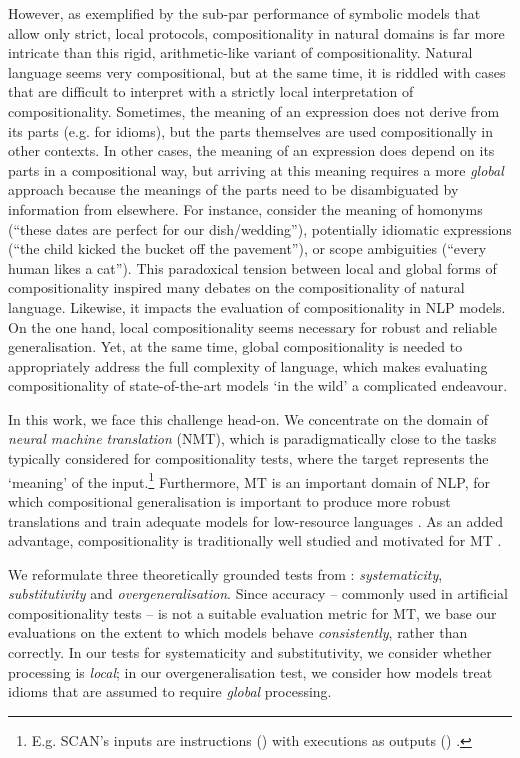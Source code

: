 However, as exemplified by the sub-par performance of symbolic models that allow only strict, local protocols, compositionality in natural domains is far more intricate than this rigid, arithmetic-like variant of compositionality.
Natural language seems very compositional, but at the same time, it is riddled with cases that are difficult to interpret with a strictly local interpretation of compositionality.
Sometimes, the meaning of an expression does not derive from its parts (e.g. for idioms), but the parts themselves are used compositionally in other contexts.
In other cases, the meaning of an expression does depend on its parts in a compositional way, but arriving at this meaning requires a more \textit{global} approach because the meanings of the parts need to be disambiguated by information from elsewhere.
For instance, consider the meaning of homonyms (``these dates are perfect for our dish/wedding''), potentially idiomatic expressions (``the child kicked the bucket off the pavement''), or scope ambiguities (``every human likes a cat'').
This paradoxical tension between local and global forms of compositionality inspired many debates on the compositionality of natural language.
Likewise, it impacts the evaluation of compositionality in NLP models.
On the one hand, local compositionality seems necessary for robust and reliable generalisation.
Yet, at the same time, global compositionality is needed to appropriately address the full complexity of language, which makes evaluating compositionality of state-of-the-art models `in the wild' a complicated endeavour.

In this work, we face this challenge head-on.
We concentrate on the domain of \textit{neural machine translation} (NMT), which is paradigmatically close to the tasks typically considered for compositionality tests, where the target represents the `meaning' of the input.\footnote{E.g. SCAN's inputs are instructions () with executions as outputs () \citep{lake2018generalization}.}
Furthermore, MT is an important domain of NLP, for which compositional generalisation is important to produce more robust translations and train adequate models for low-resource languages \citep[see, e.g.][]{chaabouni2021can}.
As an added advantage, compositionality is traditionally well studied and motivated for MT \citep{rosetta1994rosetta,janssen1997compositionality,janssen1998algebraic}.

We reformulate three theoretically grounded tests from \citet{hupkes2020compositionality}: \emph{systematicity}, \emph{substitutivity} and \emph{overgeneralisation}.
Since accuracy -- commonly used in artificial compositionality tests -- is not a suitable evaluation metric for MT, we base our evaluations on the extent to which models behave \emph{consistently}, rather than correctly.
In our tests for systematicity and substitutivity, we consider whether processing is \emph{local}; in our overgeneralisation test, we consider how models treat idioms that are assumed to require \emph{global} processing.

